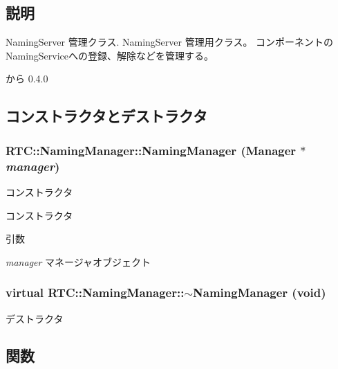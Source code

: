 \subsection{説明}
NamingServer 管理クラス. NamingServer 管理用クラス。 コンポーネントのNamingServiceへの登録、解除などを管理する。

\begin{DoxySince}{から}
0.4.0 
\end{DoxySince}


\subsection{コンストラクタとデストラクタ}
\subsubsection[{NamingManager}]{\setlength{\rightskip}{0pt plus 5cm}RTC::NamingManager::NamingManager ({\bf Manager} $\ast$ {\em manager})}\label{classRTC_1_1NamingManager_a2d927cb41678fb5f21335515340d2c86}


コンストラクタ 

コンストラクタ


\begin{DoxyParams}{引数}
\item[{\em manager}]マネージャオブジェクト \end{DoxyParams}
\subsubsection[{$\sim$NamingManager}]{\setlength{\rightskip}{0pt plus 5cm}virtual RTC::NamingManager::$\sim$NamingManager (void)\hspace{0.3cm}{\ttfamily  [virtual]}}\label{classRTC_1_1NamingManager_ab8aede9161f52b474eb9ce4a0cfc0bcb}


デストラクタ 



\subsection{関数}
